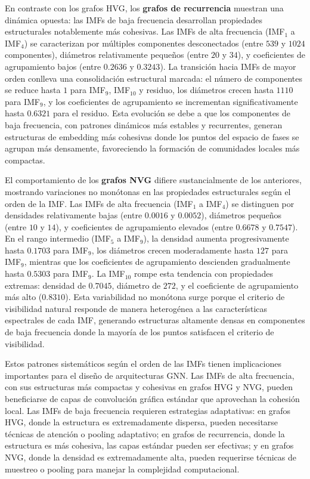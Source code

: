 \documentclass[11pt,a4paper]{article}
\begin{document}
En contraste con los grafos HVG, los \textbf{grafos de recurrencia} muestran una dinámica opuesta: las IMFs de baja frecuencia desarrollan propiedades estructurales notablemente más cohesivas. Las IMFs de alta frecuencia (IMF$_1$ a IMF$_4$) se caracterizan por múltiples componentes desconectados (entre $539$ y $1024$ componentes), diámetros relativamente pequeños (entre $20$ y $34$), y coeficientes de agrupamiento bajos (entre $0.2636$ y $0.3243$). La transición hacia IMFs de mayor orden conlleva una consolidación estructural marcada: el número de componentes se reduce hasta $1$ para IMF$_9$, IMF$_{10}$ y residuo, los diámetros crecen hasta $1110$ para IMF$_9$, y los coeficientes de agrupamiento se incrementan significativamente hasta $0.6321$ para el residuo. Esta evolución se debe a que los componentes de baja frecuencia, con patrones dinámicos más estables y recurrentes, generan estructuras de embedding más cohesivas donde los puntos del espacio de fases se agrupan más densamente, favoreciendo la formación de comunidades locales más compactas.

El comportamiento de los \textbf{grafos NVG} difiere sustancialmente de los anteriores, mostrando variaciones no monótonas en las propiedades estructurales según el orden de la IMF. Las IMFs de alta frecuencia (IMF$_1$ a IMF$_4$) se distinguen por densidades relativamente bajas (entre $0.0016$ y $0.0052$), diámetros pequeños (entre $10$ y $14$), y coeficientes de agrupamiento elevados (entre $0.6678$ y $0.7547$). En el rango intermedio (IMF$_5$ a IMF$_9$), la densidad aumenta progresivamente hasta $0.1703$ para IMF$_9$, los diámetros crecen moderadamente hasta $127$ para IMF$_9$, mientras que los coeficientes de agrupamiento descienden gradualmente hasta $0.5303$ para IMF$_9$. La IMF$_{10}$ rompe esta tendencia con propiedades extremas: densidad de $0.7045$, diámetro de $272$, y el coeficiente de agrupamiento más alto ($0.8310$). Esta variabilidad no monótona surge porque el criterio de visibilidad natural responde de manera heterogénea a las características espectrales de cada IMF, generando estructuras altamente densas en componentes de baja frecuencia donde la mayoría de los puntos satisfacen el criterio de visibilidad.

Estos patrones sistemáticos según el orden de las IMFs tienen implicaciones importantes para el diseño de arquitecturas GNN. Las IMFs de alta frecuencia, con sus estructuras más compactas y cohesivas en grafos HVG y NVG, pueden beneficiarse de capas de convolución gráfica estándar que aprovechan la cohesión local. Las IMFs de baja frecuencia requieren estrategias adaptativas: en grafos HVG, donde la estructura es extremadamente dispersa, pueden necesitarse técnicas de atención o pooling adaptativo; en grafos de recurrencia, donde la estructura es más cohesiva, las capas estándar pueden ser efectivas; y en grafos NVG, donde la densidad es extremadamente alta, pueden requerirse técnicas de muestreo o pooling para manejar la complejidad computacional.
\end{document}
